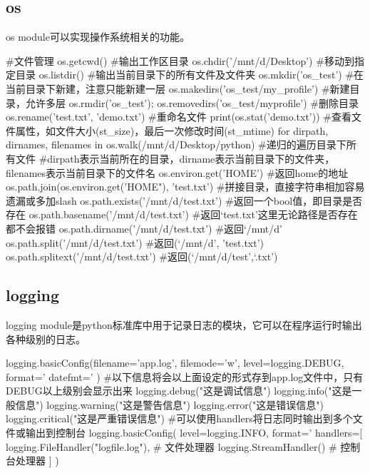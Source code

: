 \documentclass{article}
\begin{document}
    \subsection{os}
      os module可以实现操作系统相关的功能。
      \begin{codeblock}[language=python, caption={os module}]
        #文件管理
        os.getcwd() #输出工作区目录
        os.chdir('/mnt/d/Desktop') #移动到指定目录
        os.listdir() #输出当前目录下的所有文件及文件夹
        os.mkdir('os_test') #在当前目录下新建，注意只能新建一层
        os.makedirs('os_test/my_profile') #新建目录，允许多层
        os.rmdir('os_test'); os.removedirs('os_test/myprofile') #删除目录
        os.rename('test.txt', 'demo.txt') #重命名文件
        print(os.stat('demo.txt')) #查看文件属性，如文件大小(st\_size)，最后一次修改时间(st\_mtime)
        for dirpath, dirnames, filenames in os.walk(/mnt/d/Desktop/python) #递归的遍历目录下所有文件
        #dirpath表示当前所在的目录，dirname表示当前目录下的文件夹，filenames表示当前目录下的文件名
        os.environ.get('HOME') #返回home的地址
        os.path.join(os.environ.get('HOME"), 'test.txt') #拼接目录，直接字符串相加容易遗漏或多加slash
        os.path.exists('/mnt/d/test.txt') #返回一个bool值，即目录是否存在
        os.path.basename('/mnt/d/test.txt') #返回`test.txt'这里无论路径是否存在都不会报错
        os.path.dirname('/mnt/d/test.txt') #返回`/mnt/d'
        os.path.split('/mnt/d/test.txt') #返回(`/mnt/d', 'test.txt')
        os.path.splitext('/mnt/d/test.txt') #返回(`/mnt/d/test',`.txt')
      \end{codeblock}

    \subsection{logging}
      logging module是python标准库中用于记录日志的模块，它可以在程序运行时输出各种级别的日志。
      \begin{codeblock}[language=python, caption={logging module}]
        logging.basicConfig(filename='app.log', filemode='w', level=logging.DEBUG,
                    format='%
                    datefmt='%
                    )
        #以下信息将会以上面设定的形式存到app.log文件中，只有DEBUG以上级别会显示出来
        logging.debug("这是调试信息")
        logging.info("这是一般信息")
        logging.warning("这是警告信息")
        logging.error("这是错误信息")
        logging.critical("这是严重错误信息")
        #可以使用handlers将日志同时输出到多个文件或输出到控制台
        logging.basicConfig(
            level=logging.INFO,
            format='%
            handlers=[
                logging.FileHandler("logfile.log"),   # 文件处理器
                logging.StreamHandler()               # 控制台处理器
            ]
        )
      \end{codeblock}
\end{document}
